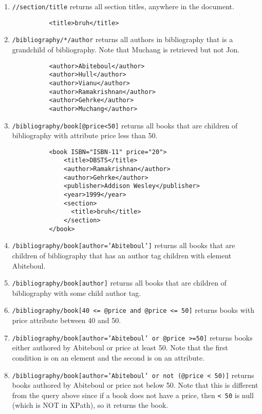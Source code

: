 \begin{example}
\begin{enumerate}
      \item \texttt{//section/title} returns all section titles, anywhere in the document.
        \begin{lstlisting}
          <title>bruh</title>
        \end{lstlisting}

      \item \texttt{/bibliography/*/author} returns all authors in bibliography that is a grandchild of bibliography. Note that Muchang is retrieved but not Jon. 
        \begin{lstlisting}
          <author>Abiteboul</author>
          <author>Hull</author>
          <author>Vianu</author>
          <author>Ramakrishnan</author>
          <author>Gehrke</author>
          <author>Muchang</author>
        \end{lstlisting}

      \item \texttt{/bibliography/book[@price<50]} returns all books that are children of bibliography with attribute price less than 50. 
        \begin{lstlisting}
          <book ISBN="ISBN-11" price="20">
              <title>DBSTS</title>
              <author>Ramakrishnan</author>
              <author>Gehrke</author>
              <publisher>Addison Wesley</publisher>
              <year>1999</year>
              <section>
                <title>bruh</title>
              </section>
          </book>
        \end{lstlisting}

      \item \texttt{/bibliography/book[author='Abiteboul']} returns all books that are children of bibliography that has an author tag children with element Abiteboul. 

      \item \texttt{/bibliography/book[author]} returns all books that are children of bibliography with some child author tag. 

      \item \texttt{/bibliography/book[40 <= @price and @price <= 50]} returns books with price attribute between 40 and 50. 

      \item \texttt{/bibliography/book[author='Abiteboul' or @price >=50]} returns books either authored by Abiteboul or price at least 50. Note that the first condition is on an element and the second is on an attribute. 

      \item \texttt{/bibliography/book[author='Abiteboul' or not (@price < 50)]} returns books authored by Abiteboul or price not below 50. Note that this is different from the query above since if a book does not have a price, then \texttt{\@price < 50} is null (which is NOT in XPath), so it returns the book. 
    \end{enumerate}
  \end{example}

